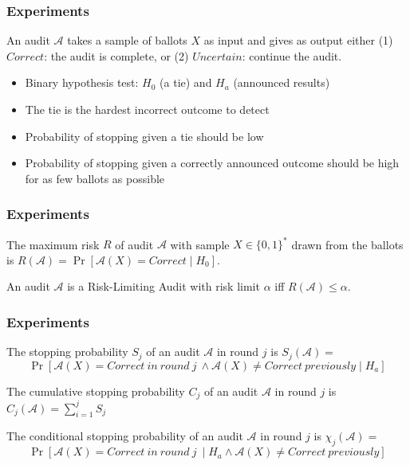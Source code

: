 \documentclass[aspectratio=169]{beamer}
\begin{document}
\begin{frame}
\frametitle{Experiments}
\begin{definition}
An audit $\mathcal{A}$ takes a sample of ballots $X$ as input and gives as output either
(1) $Correct$: the audit is complete, or (2) $Uncertain$: continue the audit.
\end{definition}

\pause 
\begin{itemize}
\item Binary hypothesis test: $H_0$ (a tie) and $H_a$ (announced results)
\pause 
\item The tie is the hardest incorrect outcome to detect 
\pause 
\item Probability of stopping given a tie should be low
\pause 
\item Probability of stopping given a correctly announced outcome should be high for as few ballots as possible 
\end{itemize}
\end{frame}

\begin{frame}
\frametitle{Experiments}
\begin{definition}
The maximum risk $R$ of audit $\mathcal{A}$ with sample $X\in \{0,1\}^*$ drawn from 
the ballots is
$R(\mathcal{A})=\Pr[\mathcal{A}(X)=Correct \mid H_0].$
\end{definition}

\pause 
\begin{definition}
An audit $\mathcal{A}$ is a Risk-Limiting Audit with 
risk limit $\alpha$ iff 
$R(\mathcal{A}) \le \alpha.$
\end{definition}
\end{frame}

\begin{frame}
\frametitle{Experiments}
\begin{definition}
The stopping probability $S_j$ of an audit $\mathcal{A}$ in round $j$ is 
$S_j(\mathcal{A})=$
$$\Pr[\mathcal{A}(X)=Correct ~in~round~j~\land \mathcal{A}(X) \neq Correct ~previously \mid H_a]$$
\end{definition}

\pause 
\begin{definition}
The cumulative stopping probability $C_j$ of an audit $\mathcal{A}$ in round $j$ is $C_j(\mathcal{A})= \sum_{i=1}^j S_j$
\end{definition}

\pause 
\begin{definition}
The conditional stopping probability  of an audit $\mathcal{A}$ in round $j$ is 
$\chi_j (\mathcal{A})=$
$$\Pr[\mathcal{A}(X)=Correct ~in~round~j~\mid H_a \land \mathcal{A}(X) \neq Correct ~previously]$$
\end{definition}
\end{frame}
\end{document}
